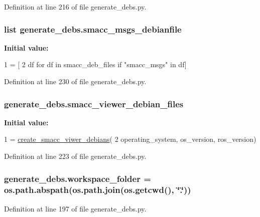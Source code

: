 Definition at line 216 of file generate\+\_\+debs.\+py.

\subsubsection[{\texorpdfstring{smacc\+\_\+msgs\+\_\+debianfile}{smacc_msgs_debianfile}}]{\setlength{\rightskip}{0pt plus 5cm}list generate\+\_\+debs.\+smacc\+\_\+msgs\+\_\+debianfile}\hypertarget{namespacegenerate__debs_aee54b2480a34decc910ca23b644951b7}{}\label{namespacegenerate__debs_aee54b2480a34decc910ca23b644951b7}
{\bfseries Initial value\+:}
\begin{DoxyCode}
1 = [
2         df \textcolor{keywordflow}{for} df \textcolor{keywordflow}{in} smacc\_deb\_files \textcolor{keywordflow}{if} \textcolor{stringliteral}{"smacc\_msgs"} \textcolor{keywordflow}{in} df]
\end{DoxyCode}


Definition at line 230 of file generate\+\_\+debs.\+py.

\subsubsection[{\texorpdfstring{smacc\+\_\+viewer\+\_\+debian\+\_\+files}{smacc_viewer_debian_files}}]{\setlength{\rightskip}{0pt plus 5cm}generate\+\_\+debs.\+smacc\+\_\+viewer\+\_\+debian\+\_\+files}\hypertarget{namespacegenerate__debs_a5d62bd0325adab581fa72927cb0a1ba8}{}\label{namespacegenerate__debs_a5d62bd0325adab581fa72927cb0a1ba8}
{\bfseries Initial value\+:}
\begin{DoxyCode}
1 = \hyperlink{namespacegenerate__debs_a1528f55b81a69cda3638628d37813bcf}{create\_smacc\_viwer\_debians}(
2         operating\_system, os\_version, ros\_version)
\end{DoxyCode}


Definition at line 223 of file generate\+\_\+debs.\+py.

\subsubsection[{\texorpdfstring{workspace\+\_\+folder}{workspace_folder}}]{\setlength{\rightskip}{0pt plus 5cm}generate\+\_\+debs.\+workspace\+\_\+folder = os.\+path.\+abspath(os.\+path.\+join(os.\+getcwd(), \char`\"{}.\char`\"{}))}\hypertarget{namespacegenerate__debs_acb69863b90257249a30e43ebacfb8bd8}{}\label{namespacegenerate__debs_acb69863b90257249a30e43ebacfb8bd8}


Definition at line 197 of file generate\+\_\+debs.\+py.

